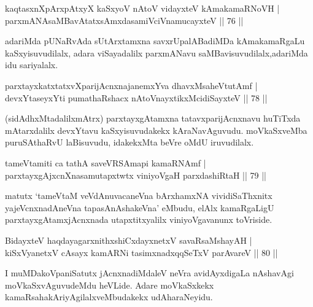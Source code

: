 
\begin{shl}
kaqtasxnXpArxpAtxyX kaSxyoV nAtoV vidayxteV kAmakamaRNoVH |\\
parxmANAsaMBavAtatxsAmxdasamiVciVnamucayxteV \hfill || 76 ||
\end{shl}

\begin{artha}
adariMda pUNaRvAda sUtArxtamxna savxrUpalABadiMDa kAmakamaRgaLu kaSxyisuvudilalx, adara viSayadalilx parxmANavu saMBavisuvudilalx,adariMda idu sariyalalx.
\end{artha}


\begin{shl}
parxtayxkatxtatxvXparijAcnxnajanemxYva dhavxMsaheVtutAmf |\\
devxYtaseyxYti pumathaRshacx nAtoV\s nayxtikxMcidiSayxteV \hfill || 78 ||
\end{shl}

\begin{artha}
(sidAdhxMtadalilxmAtrx) parxtayxgAtamxna tatavxparijAcnxnavu huTiTxda mAtarxdalilx devxYtavu kaSxyisuvudakekx kAraNavAguvudu. moVkaSxveMba puruSAthaRvU laBisuvudu, idakekxMta beVre oMdU iruvudilalx.
\end{artha}

\begin{shl}
tameVtamiti ca tathA saveVRSAmapi kamaRNAmf |\\
parxtayxgAjxcnXnasamutapxtwtx viniyoVgaH parxdashiRtaH \hfill || 79 ||
\end{shl}

\begin{artha}
matutx `tameVtaM veVdAnuvacaneVna bArxhamxNA vividiSaThxnitx yajeVcnxnadAneVna tapasA\s nAshakeVna' eMbudu, elAlx kamaRgaLigU parxtayxgAtamxjAcnxnada utapxtitxyalilx viniyoVgavanunx toVriside.
\end{artha}

\begin{shl}
BidayxteV haqdayagarxnithxshiCxdayxnetxV savaRsaMshayAH |\\
kiSxVyanetxV cAsayx kamARNi tasimxnadxqqSeTxV parAvareV \hfill || 80 ||
\end{shl}

\begin{artha}
I muMDakoVpaniSatutx jAcnxnadiMdaleV neVra avidAyxdigaLa nAshavAgi moVkaSxvAguvudeMdu heVLide. Adare moVkaSxkekx kamaRsahakAriyAgilalxveMbudakekx udAharaNeyidu.
\end{artha}


